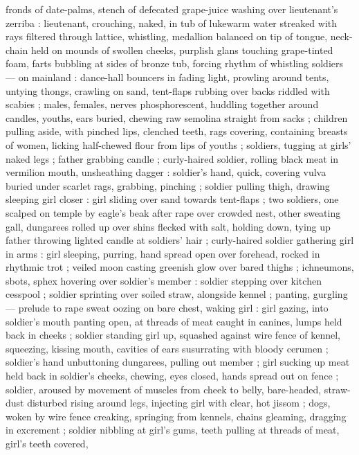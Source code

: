fronds of date-palms, stench of defecated grape-juice washing over lieutenant's zerriba :
lieutenant, crouching, naked, in tub of lukewarm water streaked with rays filtered through lattice,
whistling, medallion balanced on tip of tongue, neck-chain held on mounds of swollen cheeks,
purplish glans touching grape-tinted foam, farts bubbling at sides of bronze tub, forcing rhythm of
whistling {\semislash} soldiers --- on mainland : dance-hall bouncers {\dashcom} in fading light,
prowling around tents, untying thongs, crawling on sand, tent-flaps rubbing over backs riddled with
scabies ; males, females, nerves phosphorescent, huddling together around candles, youths, ears
buried, chewing raw semolina straight from sacks ; children pulling aside, with pinched lips,
clenched teeth, rags covering, containing breasts of women, licking half-chewed flour from lips of
youths ; soldiers, tugging at girls' naked legs ; father grabbing candle ; curly-haired soldier,
rolling black meat in vermilion mouth, unsheathing dagger : soldier's hand, quick, covering vulva
buried under scarlet rags, grabbing, pinching ; soldier pulling thigh, drawing sleeping girl %
closer : girl sliding over sand towards tent-flaps ; two soldiers, one scalped on temple by eagle's
beak after rape over crowded nest, other sweating gall, dungarees rolled up over shins flecked with
salt, holding down, tying up father throwing lighted candle at soldiers' hair ; curly-haired soldier
gathering girl in arms : girl sleeping, purring, hand spread open over forehead, rocked in rhythmic
trot ; veiled moon casting greenish glow over bared thighs ; ichneumons, sbots, sphex hovering over
soldier's member : soldier stepping over kitchen cesspool ; soldier sprinting over soiled straw,
alongside kennel ; panting, gurgling --- prelude to rape {\dashcom} sweat oozing on bare chest,
waking girl : girl gazing, into soldier's mouth panting open, at threads of meat caught in canines,
lumps held back in cheeks ; soldier standing girl up, squashed against wire fence of kennel,
squeezing, kissing mouth, cavities of ears susurrating with bloody cerumen ; soldier's hand
unbuttoning dungarees, pulling out member ; girl sucking up meat held back in soldier's cheeks,
chewing, eyes closed, hands spread out on fence ; soldier, aroused by movement of muscles from cheek
to belly, bare-headed, straw-dust disturbed rising around legs, injecting girl with clear, hot
jissom ; dogs, woken by wire fence creaking, springing from kennels, chains gleaming, dragging in
excrement ; soldier nibbling at girl's gums, teeth pulling at threads of meat, girl's teeth covered,
